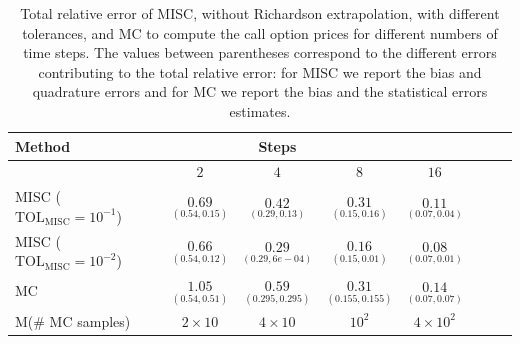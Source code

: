 \FloatBarrier

\begin{table}[h!]
	\centering
	\begin{tabular}{l*{6}{c}r}
	\toprule[1.5pt]
	Method & & Steps  & &     \\
	\hline
		    & $2$ & $4$ & $8$  & $16$  \\
		\hline

		MISC ($\text{TOL}_{\text{MISC}}=10^{-1}$)  & $\underset{(0.54,0.15)}{\mathbf{
			0.69}}$& $ \underset{(0.29,0.13)}{\mathbf{    
			0.42}}$ & $ \underset{(0.15,0.16)}{\mathbf{     
			0.31
		}}$   & $ \underset{(0.07,0.04)}{\mathbf{     
			0.11
		}}$ \\

		MISC ($\text{TOL}_{\text{MISC}}=10^{-2}$)  & $\underset{(0.54,0.12)}{\mathbf{ 
			0.66}}$ & $ \underset{(0.29,6e-04)}{\mathbf{  0.29}}$ & $\underset{(0.15,0.01)}{\mathbf{    0.16}}$&  $ \underset{(0.07,0.01)}{\mathbf{0.08}}$  \\
				\hline
				MC    & $\underset{(0.54,0.51)}{\mathbf{1.05}}$  & $\underset{(0.295,0.295)}{\mathbf{0.59}}$  &$\underset{(0.155,0.155)}{
				\mathbf{0.31}}$& $\underset{(0.07,0.07)}{
				\mathbf{0.14}}$ \\	
		M(\# MC samples)   & $2 \times 10$  & $4 \times 10$  &$10^2$  & $4 \times 10^2$ \\
		\bottomrule[1.25pt]
	\end{tabular}
	\caption{Total relative error of MISC, without Richardson extrapolation, with different tolerances, and MC to compute the call option prices for different numbers of time steps. The values between parentheses correspond to the different errors contributing to the total relative error: for MISC we report the bias and quadrature errors and for MC we report the bias and the statistical errors estimates. }
	\label{Total error of MISC and MC to compute Call option price of the different tolerances for different number of time steps. Case $K=1$, $H=0.07$, without Richardson extrapolation. The numbers between parentheses are the corresponding absolute errors,linear}
\end{table}
\FloatBarrier




